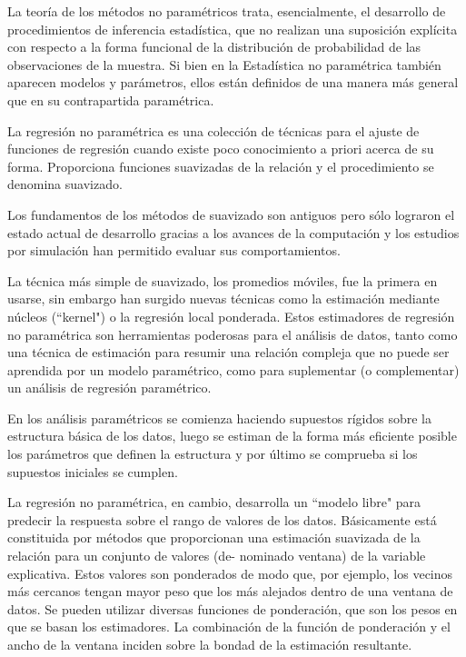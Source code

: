 \hspace{0.4cm} La teor\'ia de los m\'etodos no param\'etricos trata, esencialmente, el desarrollo de procedimientos de inferencia estad\'istica, que no realizan una suposici\'on expl\'icita con respecto a la forma funcional de la 
distribuci\'on de probabilidad de las observaciones de la muestra. Si bien en la Estad\'istica no param\'etrica tambi\'en aparecen modelos y par\'ametros, ellos est\'an definidos de una manera m\'as general que en su contrapartida param\'etrica.

\hspace{0.4cm}La regresi\'on no param\'etrica es una colecci\'on de t\'ecnicas para el ajuste de funciones de regresi\'on cuando existe poco conocimiento a priori acerca de su forma. Proporciona funciones suavizadas de la relaci\'on y el procedimiento se denomina suavizado.

\hspace{0.4cm}Los fundamentos de los m\'etodos de suavizado son antiguos pero s\'olo lograron el estado actual de desarrollo gracias a los avances de la computaci\'on y los estudios por simulaci\'on han permitido evaluar sus comportamientos.

\hspace{0.4cm} La t\'ecnica m\'as simple de suavizado, los promedios m\'oviles, fue la primera en usarse, sin embargo han surgido nuevas t\'ecnicas como la estimaci\'on mediante n\'ucleos (``kernel") o la regresi\'on local ponderada. Estos estimadores de regresi\'on no param\'etrica son herramientas poderosas para el an\'alisis de datos, tanto como una t\'ecnica de estimaci\'on para resumir una relaci\'on compleja que no puede ser aprendida por un modelo param\'etrico, como para suplementar (o complementar) un an\'alisis de regresi\'on param\'etrico.

\hspace{0.4cm}En los an\'alisis param\'etricos se comienza haciendo supuestos r\'igidos sobre la estructura b\'asica de los datos, luego se estiman de la forma m\'as eficiente posible los par\'ametros que definen la estructura y por \'ultimo se comprueba si los supuestos iniciales se cumplen.

\hspace{0.4cm}La regresi\'on no param\'etrica, en cambio, desarrolla un ``modelo libre" \hspace{0.02cm} para predecir la respuesta sobre el rango de valores de los datos. B\'asicamente est\'a constituida por m\'etodos que proporcionan una estimaci\'on suavizada de la relaci\'on para un conjunto de valores (de- nominado ventana) de la variable explicativa. Estos valores son ponderados de modo que, por ejemplo, los vecinos m\'as cercanos tengan mayor peso que los m\'as alejados dentro de una ventana de datos. Se pueden utilizar diversas funciones de ponderaci\'on, que son los pesos en que se basan los estimadores. La combinaci\'on de la funci\'on de ponderaci\'on y el ancho de la ventana inciden sobre la bondad de la estimaci\'on resultante.


